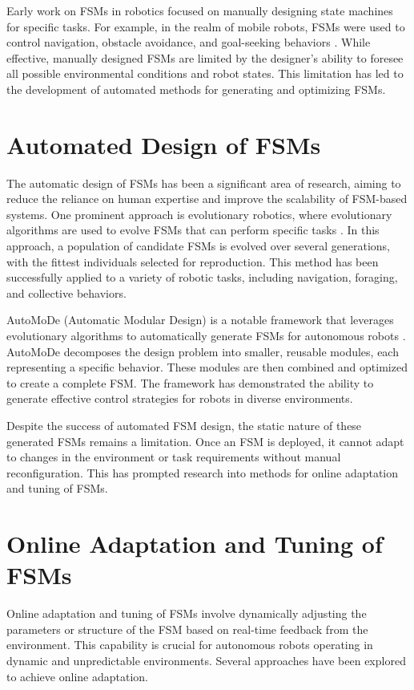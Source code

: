 \documentclass{ULBreport}
\begin{document}
Early work on FSMs in robotics focused on manually designing state machines for specific tasks. For example, in the realm of mobile robots, FSMs were used to control navigation, obstacle avoidance, and goal-seeking behaviors \cite{Brooks1991}. While effective, manually designed FSMs are limited by the designer's ability to foresee all possible environmental conditions and robot states. This limitation has led to the development of automated methods for generating and optimizing FSMs.

\section{Automated Design of FSMs}
The automatic design of FSMs has been a significant area of research, aiming to reduce the reliance on human expertise and improve the scalability of FSM-based systems. One prominent approach is evolutionary robotics, where evolutionary algorithms are used to evolve FSMs that can perform specific tasks \cite{Nolfi2000}. In this approach, a population of candidate FSMs is evolved over several generations, with the fittest individuals selected for reproduction. This method has been successfully applied to a variety of robotic tasks, including navigation, foraging, and collective behaviors.

AutoMoDe (Automatic Modular Design) is a notable framework that leverages evolutionary algorithms to automatically generate FSMs for autonomous robots \cite{Francesca2014}. AutoMoDe decomposes the design problem into smaller, reusable modules, each representing a specific behavior. These modules are then combined and optimized to create a complete FSM. The framework has demonstrated the ability to generate effective control strategies for robots in diverse environments.

Despite the success of automated FSM design, the static nature of these generated FSMs remains a limitation. Once an FSM is deployed, it cannot adapt to changes in the environment or task requirements without manual reconfiguration. This has prompted research into methods for online adaptation and tuning of FSMs.

\section{Online Adaptation and Tuning of FSMs}
Online adaptation and tuning of FSMs involve dynamically adjusting the parameters or structure of the FSM based on real-time feedback from the environment. This capability is crucial for autonomous robots operating in dynamic and unpredictable environments. Several approaches have been explored to achieve online adaptation.
\end{document}
